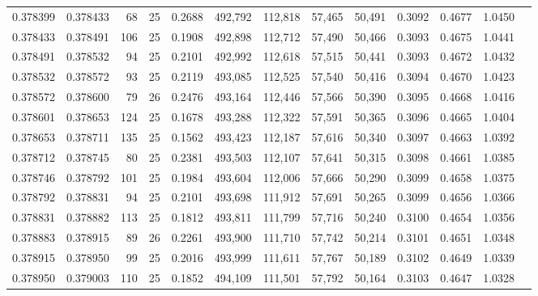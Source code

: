 \begin{tabular}{rrrrrrrrrrrrr}
0.378399 & 0.378433 &    68 &  25 &                                     0.2688 & 492,792 & 112,818 &  57,465 &  50,491 & 0.3092 & 0.4677 & 1.0450 \\
0.378433 & 0.378491 &   106 &  25 &                                     0.1908 & 492,898 & 112,712 &  57,490 &  50,466 & 0.3093 & 0.4675 & 1.0441 \\
0.378491 & 0.378532 &    94 &  25 &                                     0.2101 & 492,992 & 112,618 &  57,515 &  50,441 & 0.3093 & 0.4672 & 1.0432 \\
0.378532 & 0.378572 &    93 &  25 &                                     0.2119 & 493,085 & 112,525 &  57,540 &  50,416 & 0.3094 & 0.4670 & 1.0423 \\
0.378572 & 0.378600 &    79 &  26 &                                     0.2476 & 493,164 & 112,446 &  57,566 &  50,390 & 0.3095 & 0.4668 & 1.0416 \\
0.378601 & 0.378653 &   124 &  25 &                                     0.1678 & 493,288 & 112,322 &  57,591 &  50,365 & 0.3096 & 0.4665 & 1.0404 \\
0.378653 & 0.378711 &   135 &  25 &                                     0.1562 & 493,423 & 112,187 &  57,616 &  50,340 & 0.3097 & 0.4663 & 1.0392 \\
0.378712 & 0.378745 &    80 &  25 &                                     0.2381 & 493,503 & 112,107 &  57,641 &  50,315 & 0.3098 & 0.4661 & 1.0385 \\
0.378746 & 0.378792 &   101 &  25 &                                     0.1984 & 493,604 & 112,006 &  57,666 &  50,290 & 0.3099 & 0.4658 & 1.0375 \\
0.378792 & 0.378831 &    94 &  25 &                                     0.2101 & 493,698 & 111,912 &  57,691 &  50,265 & 0.3099 & 0.4656 & 1.0366 \\
0.378831 & 0.378882 &   113 &  25 &                                     0.1812 & 493,811 & 111,799 &  57,716 &  50,240 & 0.3100 & 0.4654 & 1.0356 \\
0.378883 & 0.378915 &    89 &  26 &                                     0.2261 & 493,900 & 111,710 &  57,742 &  50,214 & 0.3101 & 0.4651 & 1.0348 \\
0.378915 & 0.378950 &    99 &  25 &                                     0.2016 & 493,999 & 111,611 &  57,767 &  50,189 & 0.3102 & 0.4649 & 1.0339 \\
0.378950 & 0.379003 &   110 &  25 &                                     0.1852 & 494,109 & 111,501 &  57,792 &  50,164 & 0.3103 & 0.4647 & 1.0328 \\

\end{tabular}
